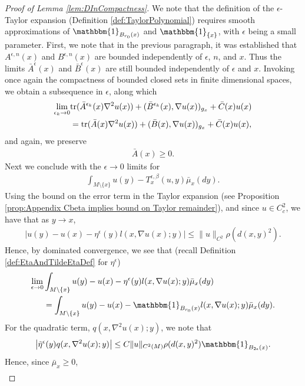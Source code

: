 \documentclass[11pt,reqno]{amsart}
\numberwithin{equation}{section}
\theoremstyle{plain}
\def\Indicator{{\mathbbm{1}}}
\def\grad{\nabla}
\def\Tr{\textnormal{tr}}
\newcommand{\abs}[1]{\left| #1 \right|}
\newcommand{\norm}[1]{\lVert#1\rVert}
\begin{document}
\begin{proof}[Proof of Lemma \ref{lem:DInCompactness}]
	We note that the definition of the $\epsilon$-Taylor expansion (Definition \ref{def:TaylorPolynomial}) requires smooth approximations of $\Indicator_{B_{r_0}(x)}$ and $\Indicator_{\{x\}}$, with $\epsilon$ being a small parameter.
	First, we note that in the previous paragraph, it was established that $A^{\epsilon,n}(x)$ and $B^{\epsilon,n}(x)$ are bounded independently of $\epsilon$, $n$, and $x$.  Thus the limits $\bar A^\epsilon(x)$ and $\bar B^\epsilon(x)$ are still bounded independently of $\epsilon$ and $x$.  Invoking once again the compactness of bounded closed sets in finite dimensional spaces, we obtain a subsequence in $\epsilon$, along which 
	\begin{align*}
		\lim_{\epsilon_k\to0} 
		 &\Tr(\bar A^{\epsilon_k}(x)\nabla^2u(x))+(\bar B^{\epsilon_k}(x),\nabla u(x))_{g_x}+\bar C(x)u(x)\\
		 &=
		 \Tr(\bar A(x)\nabla^2u(x))+(\bar B(x),\nabla u(x))_{g_x}+\bar C(x)u(x),
	\end{align*}
	and again, we preserve 
	\begin{align*}
		\bar A(x)\geq 0.
	\end{align*}
	Next we conclude with the $\epsilon\to0$ limits for 
	\begin{align*}
		\int_{M\setminus\{x\}} u(y)-T^{\epsilon,\beta}_x(u,y) \bar \mu_x(dy).
	\end{align*}
	Using the bound on the error term in the Taylor expansion (see Proposition \ref{prop:Appendix Cbeta implies bound on Taylor remainder}), and since $u\in C^2_c$, we have that as $y\to x$,
	\begin{align*}
          |u(y)-u(x)-\eta^\epsilon(y)l(x,\grad u(x);y)|\leq \|u\|_{C^2}\rho(d(x,y)^2).
	\end{align*}
	Hence, by dominated convergence, we see that (recall Definition \ref{def:EtaAndTildeEtaDef} for $\eta^\epsilon$)
	\begin{align*}
		\lim_{\epsilon\to0} &\int_{M\setminus\{x\}} u(y)-u(x)-\eta^\epsilon(y)l(x,\grad u(x);y)\bar \mu_x(dy)\\
		&= \int_{M\setminus\{x\}} u(y)-u(x)-\Indicator_{B_{r_0}(x)}l(x,\grad u(x);y)\bar \mu_x(dy).
	\end{align*}
	For the quadratic term, $q(x,\nabla^2 u(x);y)$, we note that
	\begin{align*}
		\abs{\tilde\eta^\epsilon(y)q(x,\nabla^2 u(x);y)}\leq C\norm{u}_{C^2(M)}\rho(d(x,y)^2)\Indicator_{B_{2\epsilon}(x)}.
	\end{align*}
	Hence, since $\bar\mu_x\geq 0$,
	\begin{align*}

\end{align*}
\end{proof}
\end{document}
